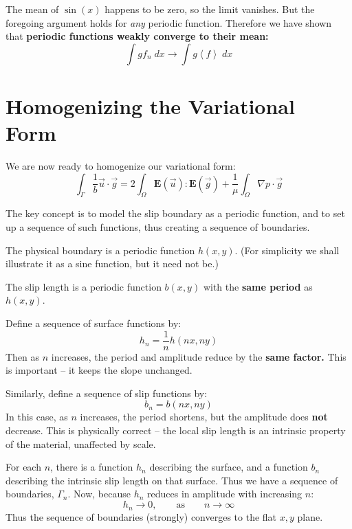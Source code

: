 \documentclass[12pt, a4paper, twoside, openright]{book}
\begin{document}
The mean of $\sin(x)$ happens to be zero, so the limit vanishes.  But the foregoing argument holds for \emph{any} periodic function.  Therefore we have shown that \textbf{periodic functions weakly converge to their mean:}
\begin{equation}
\int g f_n \;dx \to \int g \left< f \right> \;dx
\end{equation}


\section*{Homogenizing the Variational Form}

We are now ready to homogenize our variational form:
\begin{equation}
\int_{\Gamma} \frac{1}{b} \vec{u} \cdot \vec{g} = 
2 \int_{\Omega} \mathbf{E}(\vec{u}) : \mathbf{E}(\vec{g}) +
\frac{1}{\mu} \int_{\Omega}  \nabla p \cdot \vec{g}
\end{equation}

The key concept is to model the slip boundary as a periodic function, and to set up a sequence of such functions, thus creating a sequence of boundaries.
\vspace{1em}

The physical boundary is a periodic function $h(x,y)$.  (For simplicity we shall illustrate it as a sine function, but it need not be.)  

The slip length is a periodic function $b(x,y)$ with the \textbf{same period} as $h(x,y)$.

\vspace{1em}
Define a sequence of surface functions by:
\begin{equation}
h_n = \frac{1}{n} h(nx, ny)
\end{equation}
Then as $n$ increases, the period and amplitude reduce by the \textbf{same factor.}  This is important -- it keeps the slope unchanged.

Similarly, define a sequence of slip functions by:
\begin{equation}
b_n = b(nx,ny)
\end{equation}
In this case, as $n$ increases, the period shortens, but the amplitude does \textbf{not} decrease.  This is physically correct -- the local slip length is an intrinsic property of the material, unaffected by scale.

For each $n$, there is a function $h_n$ describing the surface, and a function $b_n$ describing the intrinsic slip length on that surface.  Thus we have a sequence of boundaries, $\Gamma_n$.
Now, because $h_n$ reduces in amplitude with increasing $n$:
\begin{equation}
h_n \to 0, \qquad \text{as} \qquad n \to \infty
\end{equation}
Thus the sequence of boundaries (strongly) converges to the flat $x,y$ plane.
\end{document}
